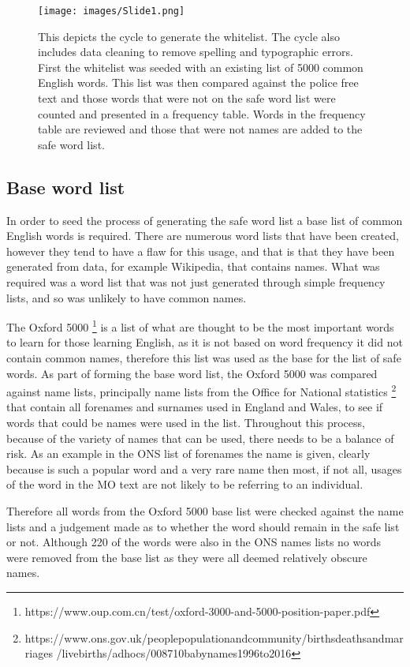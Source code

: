 \begin{figure}[!ht]
  \centering
    \texttt{[image: images/Slide1.png]}
    \caption[Whitelist Cycle.]{This depicts the cycle to generate the whitelist. The cycle also includes data cleaning to remove spelling and typographic errors. First the whitelist was seeded with an existing list of 5000 common English words. This list was then compared against the police free text and those words that were not on the safe word list were counted and presented in a frequency table. Words in the frequency table are reviewed and those that were not names are added to the safe word list.}
    \label{fig:whitelist}
\end{figure}

\subsection{Base word list} In order to seed the process of generating the safe word list a base list of common English words is required. There are numerous word lists that have been created, however they tend to have a flaw for this usage, and that is that they have been generated from data, for example Wikipedia, that contains names. What was required was a word list that was not just generated through simple frequency lists, and so was unlikely to have common names.

The Oxford 5000 \footnote{https://www.oup.com.cn/test/oxford-3000-and-5000-position-paper.pdf} is a list of what are thought to be the most important words to learn for those learning English, as it is not based on word frequency it did not contain common names, therefore this list  was used as the base for the list of safe words. As part of forming the base word list, the Oxford 5000 was compared against name lists, principally name lists from the Office for National statistics \footnote{https://www.ons.gov.uk/peoplepopulationandcommunity/birthsdeathsandmarriages /livebirths/adhocs/008710babynames1996to2016} that contain all forenames and surnames used in England and Wales, to see if words that could be names were used in the list. Throughout this process, because of the variety of names that can be used, there needs to be a balance of risk. As an example in the ONS list of forenames the name  is given, clearly because  is such a popular word and a very rare name then most, if not all, usages of the word  in the MO text are not likely to be referring to an individual. 

Therefore all words from the Oxford 5000 base list were checked against the name lists and a judgement made as to whether the word should remain in the safe list or not. Although 220 of the words were also in the ONS names lists no words were removed from the base list as they were all deemed relatively obscure names.


